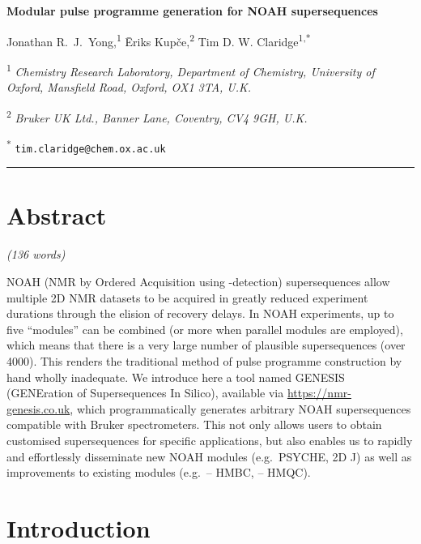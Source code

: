 \documentclass[a4paper,11pt]{article}
\newcommand{\genesistitle}{Modular pulse programme generation for NOAH supersequences}
\newcommand{\crl}{Chemistry Research Laboratory, Department of Chemistry, University of Oxford, Mansfield Road, Oxford, OX1 3TA, U.K.}
\newcommand{\brukeruk}{Bruker UK Ltd., Banner Lane, Coventry, CV4 9GH, U.K.}
\newcommand{\proton}{\ch{^{1}H}}
\newcommand{\carbon}{\ch{^{13}C}}
\newcommand{\nitrogen}{\ch{^{15}N}}
\newcommand{\CH}{\carbon{}--\proton{}}
\newcommand{\NH}{\nitrogen{}--\proton{}}
\newcommand{\theurl}{\url{https://nmr-genesis.co.uk}}
\begin{document}
\begin{refsection}

\begin{center}   %
    \textbf{\Large \genesistitle{}}

    \vspace{0.2cm}

    Jonathan R.\ J.\ Yong,\textsuperscript{1} {\=E}riks Kup{\v{c}}e,\textsuperscript{2} Tim D. W. Claridge\textsuperscript{1,*}

    \vspace{0.2cm}

    \textsuperscript{1} \textit{\crl{}}

    \textsuperscript{2} \textit{\brukeruk{}}

    \textsuperscript{*} \texttt{tim.claridge@chem.ox.ac.uk}

    \vspace{0.5cm} \hrule
\end{center}

\section*{Abstract}

\textit{(136 words)}

NOAH (NMR by Ordered Acquisition using \proton{}-detection) supersequences allow multiple 2D NMR datasets to be acquired in greatly reduced experiment durations through the elision of recovery delays.
In NOAH experiments, up to five ``modules'' can be combined (or more when parallel modules are employed), which means that there is a very large number of plausible supersequences (over 4000).
This renders the traditional method of pulse programme construction by hand wholly inadequate.
We introduce here a tool named GENESIS (GENEration of Supersequences In Silico), available via \theurl{}, which programmatically generates arbitrary NOAH supersequences compatible with Bruker spectrometers.
This not only allows users to obtain customised supersequences for specific applications, but also enables us to rapidly and effortlessly disseminate new NOAH modules (e.g.\ PSYCHE, 2D J) as well as improvements to existing modules (e.g.\ \CH{} HMBC, \NH{} HMQC).

\section{Introduction}


\end{refsection}
\end{document}
